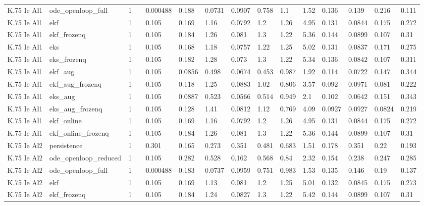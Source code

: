 \begin{table}[t]
\begin{tabular}{lllllllllllllll}
K.75 Ie Al1 & ode\_openloop\_full & 1 &  & 0.000488 & 0.188 & 0.0731 & 0.0907 & 0.758 & 1.1 & 1.52 & 0.136 & 0.139 & 0.216 & 0.111 \\
K.75 Ie Al1 & ekf & 1 &  & 0.105 & 0.169 & 1.16 & 0.0792 & 1.2 & 1.26 & 4.95 & 0.131 & 0.0844 & 0.175 & 0.272 \\
K.75 Ie Al1 & ekf\_frozenq & 1 &  & 0.105 & 0.184 & 1.26 & 0.081 & 1.3 & 1.22 & 5.36 & 0.144 & 0.0899 & 0.107 & 0.31 \\
K.75 Ie Al1 & eks & 1 &  & 0.105 & 0.168 & 1.18 & 0.0757 & 1.22 & 1.25 & 5.02 & 0.131 & 0.0837 & 0.171 & 0.275 \\
K.75 Ie Al1 & eks\_frozenq & 1 &  & 0.105 & 0.182 & 1.28 & 0.073 & 1.3 & 1.22 & 5.34 & 0.136 & 0.0842 & 0.107 & 0.311 \\
K.75 Ie Al1 & ekf\_aug & 1 &  & 0.105 & 0.0856 & 0.498 & 0.0674 & 0.453 & 0.987 & 1.92 & 0.114 & 0.0722 & 0.147 & 0.344 \\
K.75 Ie Al1 & ekf\_aug\_frozenq & 1 &  & 0.105 & 0.118 & 1.25 & 0.0883 & 1.02 & 0.806 & 3.57 & 0.092 & 0.0971 & 0.081 & 0.222 \\
K.75 Ie Al1 & eks\_aug & 1 &  & 0.105 & 0.0887 & 0.523 & 0.0566 & 0.514 & 0.949 & 2.1 & 0.102 & 0.0642 & 0.151 & 0.343 \\
K.75 Ie Al1 & eks\_aug\_frozenq & 1 &  & 0.105 & 0.128 & 1.41 & 0.0812 & 1.12 & 0.769 & 4.09 & 0.0927 & 0.0927 & 0.0824 & 0.219 \\
K.75 Ie Al1 & ekf\_online & 1 &  & 0.105 & 0.169 & 1.16 & 0.0792 & 1.2 & 1.26 & 4.95 & 0.131 & 0.0844 & 0.175 & 0.272 \\
K.75 Ie Al1 & ekf\_online\_frozenq & 1 &  & 0.105 & 0.184 & 1.26 & 0.081 & 1.3 & 1.22 & 5.36 & 0.144 & 0.0899 & 0.107 & 0.31 \\
K.75 Ie Al2 & persistence & 1 &  & 0.301 & 0.165 & 0.273 & 0.351 & 0.481 & 0.683 & 1.51 & 0.178 & 0.351 & 0.22 & 0.193 \\
K.75 Ie Al2 & ode\_openloop\_reduced & 1 &  & 0.105 & 0.282 & 0.528 & 0.162 & 0.568 & 0.84 & 2.32 & 0.154 & 0.238 & 0.247 & 0.285 \\
K.75 Ie Al2 & ode\_openloop\_full & 1 &  & 0.000488 & 0.183 & 0.0737 & 0.0959 & 0.751 & 0.983 & 1.53 & 0.135 & 0.146 & 0.19 & 0.137 \\
K.75 Ie Al2 & ekf & 1 &  & 0.105 & 0.169 & 1.13 & 0.081 & 1.2 & 1.25 & 5.01 & 0.132 & 0.0845 & 0.175 & 0.273 \\
K.75 Ie Al2 & ekf\_frozenq & 1 &  & 0.105 & 0.184 & 1.24 & 0.0827 & 1.3 & 1.22 & 5.42 & 0.144 & 0.0899 & 0.107 & 0.31 \\

\end{tabular}
\end{table}
